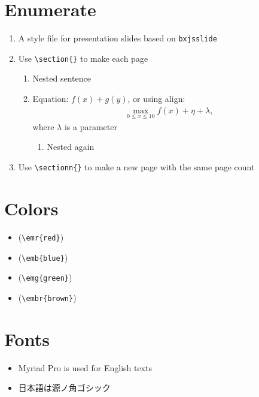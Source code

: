 \documentclass[xelatex,ja=standard,jafont=sourcehan,fleqn,no-math,21pt,paper={142.875truemm}{254truemm},english]{bxjsslidemd}
\begin{document}
\section{Enumerate}
\begin{enumerate}
 \item A style file for presentation slides based on \texttt{bxjsslide}
 \item Use \verb|\section{}| to make each page
       \begin{enumerate}
	\item Nested sentence
	\item Equation: $f(x) + g(y)$, or using align:
	      \begin{align*}
	       \max_{0 \le x \le 10} f(x) + \eta + \lambda,
	      \end{align*}
	      where $\lambda$ is a parameter
	      \begin{enumerate}
	       \item Nested again
	      \end{enumerate}
       \end{enumerate}
 \item Use \verb|\sectionn{}| to make a new page with the same page count
\end{enumerate}

\section{Colors}
\begin{itemize}
 \item {} (\verb|\emr{red}|)
 \item {} (\verb|\emb{blue}|)
 \item {} (\verb|\emg{green}|)
 \item {} (\verb|\embr{brown}|)
\end{itemize}

\section{Fonts}
\begin{itemize}
 \item Myriad Pro is used for English texts
 \item 日本語は源ノ角ゴシック
\end{itemize}
\end{document}
